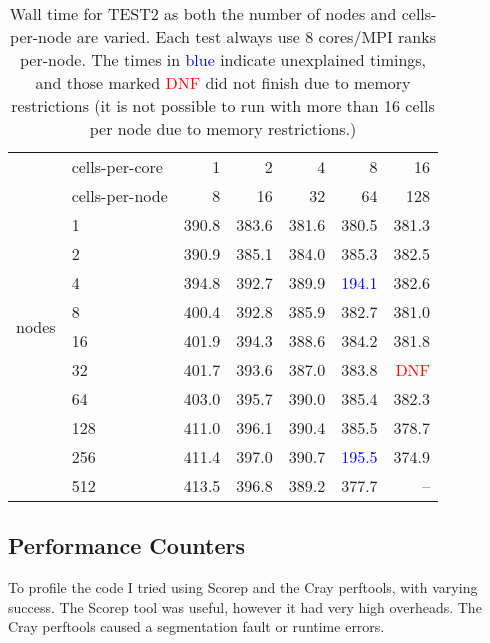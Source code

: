\begin{table}[htp!]
    \centering
\begin{tabular}{l|l|rrrrr}
\multirow{2}{*}{}
& cells-per-core  &    1  & 2     & 4     & 8  & 16  \\
& cells-per-node  &    8  & 16    & 32    & 64 & 128 \\
\hline
\multirow{8}{*}{nodes}
&1                & 390.8 & 383.6 & 381.6 & 380.5 & 381.3\\
&2                & 390.9 & 385.1 & 384.0 & 385.3 & 382.5\\
&4                & 394.8 & 392.7 & 389.9 & \textcolor{blue}{194.1} & 382.6\\
&8                & 400.4 & 392.8 & 385.9 & 382.7 & 381.0\\
&16               & 401.9 & 394.3 & 388.6 & 384.2 & 381.8\\
&32               & 401.7 & 393.6 & 387.0 & 383.8 & \textcolor{red}{DNF}\\
&64               & 403.0 & 395.7 & 390.0 & 385.4 & 382.3 \\
&128              & 411.0 & 396.1 & 390.4 & 385.5 & 378.7 \\
&256              & 411.4 & 397.0 & 390.7 & \textcolor{blue}{195.5} & 374.9\\
&512              & 413.5 & 396.8 & 389.2 & 377.7 & --\\
\end{tabular}

\label{tbl:test2scaling}
\caption{Wall time for TEST2 as both the number of nodes and cells-per-node are varied. Each test always use 8 cores/MPI ranks per-node. The times in \textcolor{blue}{blue} indicate unexplained timings, and those marked \textcolor{red}{DNF} did not finish due to memory restrictions (it is not possible to run with more than 16 cells per node due to memory restrictions.)}
\end{table}

\subsection{Performance Counters}
To profile the code I tried using Scorep and the Cray perftools, with varying success. The Scorep tool was useful, however it had very high overheads. The Cray perftools caused a segmentation fault or runtime errors.

